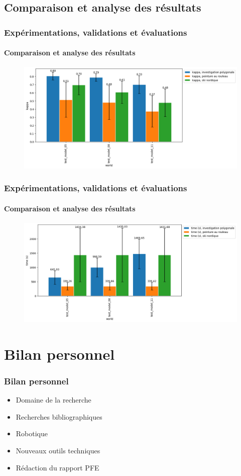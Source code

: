 \documentclass{beamer}
\begin{document}
		\subsection{Comparaison et analyse des résultats}
			\begin{frame}
				\frametitle{Expérimentations, validations et évaluations}
				\framesubtitle{Comparaison et analyse des résultats}
				\begin{figure}[H]
					\includegraphics[width=\linewidth]{graphics/investigation_polygonale-peinture_au_rouleau_ski_nordique-kappa_for_each_world_vs_investigation_polygonale-kappa_for_each_world.png}
				\end{figure}
			\end{frame}
			\begin{frame}
				\frametitle{Expérimentations, validations et évaluations}
				\framesubtitle{Comparaison et analyse des résultats}
				\begin{figure}[H]
					\includegraphics[width=\linewidth]{graphics/investigation_polygonale-peinture_au_rouleau_ski_nordique-time_for_each_world_vs_investigation_polygonale-time_for_each_world.png}
				\end{figure}
			\end{frame}
	\section{Bilan personnel}
		\begin{frame}
			\frametitle{Bilan personnel}
			\begin{itemize}
				\item Domaine de la recherche
				\item Recherches bibliographiques
				\item Robotique
				\item Nouveaux outils techniques
				\item Rédaction du rapport PFE
			\end{itemize}
		\end{frame}
\end{document}
